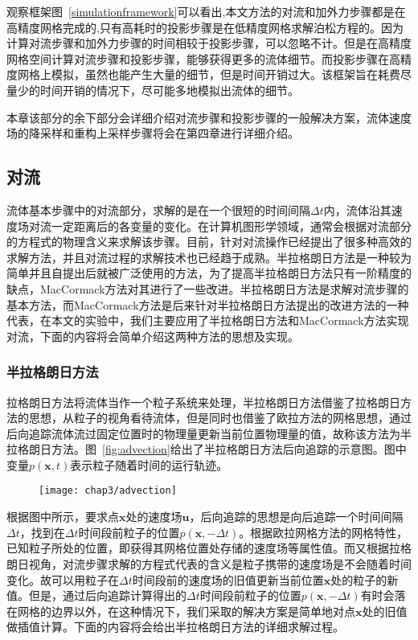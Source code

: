 观察框架图~\ref{simulationframework}可以看出,本文方法的对流和加外力步骤都是在高精度网格完成的,只有高耗时的投影步骤是在低精度网格求解泊松方程的。因为计算对流步骤和加外力步骤的时间相较于投影步骤，可以忽略不计。但是在高精度网格空间计算对流步骤和投影步骤，能够获得更多的流体细节。而投影步骤在高精度网格上模拟，虽然也能产生大量的细节，但是时间开销过大。该框架旨在耗费尽量少的时间开销的情况下，尽可能多地模拟出流体的细节。

本章该部分的余下部分会详细介绍对流步骤和投影步骤的一般解决方案，流体速度场的降采样和重构上采样步骤将会在第四章进行详细介绍。

\subsection{对流}

流体基本步骤中的对流部分，求解的是在一个很短的时间间隔$\Delta t$内，流体沿其速度场对流一定距离后的各变量的变化。在计算机图形学领域，通常会根据对流部分的方程式的物理含义来求解该步骤。目前，针对对流操作已经提出了很多种高效的求解方法，并且对流过程的求解技术也已经趋于成熟。半拉格朗日方法是一种较为简单并且自提出后就被广泛使用的方法，为了提高半拉格朗日方法只有一阶精度的缺点，MacCormack方法对其进行了一些改进。半拉格朗日方法是求解对流步骤的基本方法，而MacCormack方法是后来针对半拉格朗日方法提出的改进方法的一种代表，在本文的实验中，我们主要应用了半拉格朗日方法和MacCormack方法实现对流，下面的内容将会简单介绍这两种方法的思想及实现。

\subsubsection{半拉格朗日方法}

拉格朗日方法将流体当作一个粒子系统来处理，半拉格朗日方法借鉴了拉格朗日方法的思想，从粒子的视角看待流体，但是同时也借鉴了欧拉方法的网格思想，通过后向追踪流体流过固定位置时的物理量更新当前位置物理量的值，故称该方法为半拉格朗日方法。图~\ref{fig:advection}给出了半拉格朗日方法后向追踪的示意图。图中变量$p(\boldsymbol x,t)$表示粒子随着时间的运行轨迹。

\begin{figure}[ht]
  \centering
   \texttt{[image: chap3/advection]}
\end{figure}

根据图中所示，要求点$\boldsymbol x$处的速度场$\boldsymbol u$，后向追踪的思想是向后追踪一个时间间隔$\Delta t$，找到在$\Delta t$时间段前粒子的位置$p(\boldsymbol x, -\Delta t)$。根据欧拉网格方法的网格特性，已知粒子所处的位置，即获得其网格位置处存储的速度场等属性值。而又根据拉格朗日视角，对流步骤求解的方程式代表的含义是粒子携带的速度场是不会随着时间变化。故可以用粒子在$\Delta t$时间段前的速度场的旧值更新当前位置$\boldsymbol x$处的粒子的新值。但是，通过后向追踪计算得出的$\Delta t$时间段前粒子的位置$p(\boldsymbol x, -\Delta t)$有时会落在网格的边界以外，在这种情况下，我们采取的解决方案是简单地对点$\boldsymbol x$处的旧值做插值计算。下面的内容将会给出半拉格朗日方法的详细求解过程。


